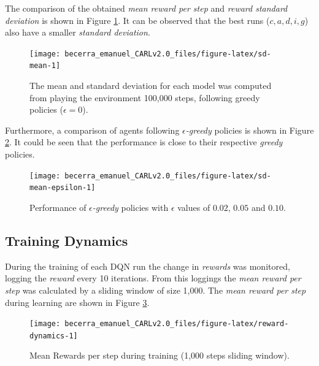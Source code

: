 \documentclass[
  12pt,
  openany]{book}
\begin{document}
The comparison of the obtained \emph{mean reward per step} and \emph{reward standard deviation} is shown in Figure \ref{fig:sd-mean}. It can be observed that the best runs (\(c,a,d,i,g\)) also have a smaller \emph{standard deviation}.



\begin{figure}

{\centering \texttt{[image: becerra\_emanuel\_CARLv2.0\_files/figure-latex/sd-mean-1]} 

}

\caption{The mean and standard deviation for each model was computed from playing the environment 100,000 steps, following greedy policies (\(\epsilon=0\)).}\label{fig:sd-mean}
\end{figure}

Furthermore, a comparison of agents following \emph{\(\epsilon\)-greedy} policies is shown in Figure \ref{fig:sd-mean-epsilon}. It could be seen that the performance is close to their respective \emph{greedy} policies.



\begin{figure}

{\centering \texttt{[image: becerra\_emanuel\_CARLv2.0\_files/figure-latex/sd-mean-epsilon-1]} 

}

\caption{Performance of \emph{\(\epsilon\)-greedy} policies with \(\epsilon\) values of \(0.02\), \(0.05\) and \(0.10\).}\label{fig:sd-mean-epsilon}
\end{figure}

\hypertarget{training-dynamics}{%
\subsection{Training Dynamics}\label{training-dynamics}}

During the training of each DQN run the change in \emph{rewards} was monitored, logging the \emph{reward} every 10 iterations. From this loggings the \emph{mean reward per step} was calculated by a sliding window of size 1,000. The \emph{mean reward per step} during learning are shown in Figure \ref{fig:reward-dynamics}.



\begin{figure}

{\centering \texttt{[image: becerra\_emanuel\_CARLv2.0\_files/figure-latex/reward-dynamics-1]} 

}

\caption{Mean Rewards per step during training (1,000 steps sliding window).}\label{fig:reward-dynamics}
\end{figure}
\end{document}
